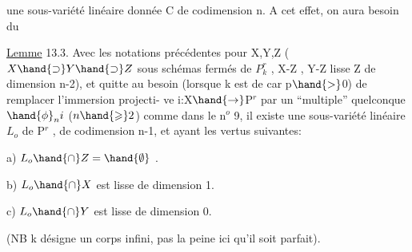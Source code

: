 
une sous-variété linéaire donnée C  de codimension n.  A cet effet,
on aura besoin du

\uline{Lemme} 13.3.  Avec les notations précédentes pour  X,Y,Z  ($X\hand{\supset} Y\hand{\supset} Z$
sous schémas fermés de $P^r_k$ , X-Z\hand{,} ,
Y-Z lisse \hand{,} Z de dimension \hand{$\leqslant$}n-2), et quitte
au besoin (lorsque k est de car p$\hand{>}$0)  de remplacer l'immersion projecti-%
ve  i:X$\hand{\rightarrow}$P$^r$  par  un ``multiple'' quelconque $\hand{\phi}_n i$ ($n \hand{\geqslant} 2$)  comme dans le
n$^o$ 9,  il existe une sous-variété linéaire  $L_o$ de P$^r$ , de codimension
n-1, et ayant les vertus suivantes:

a)  $L_o \hand{\cap} Z = \hand{\emptyset}$ .

b)  $L_o \hand{\cap} X$  est lisse de dimension 1.

c)  $L_o \hand{\cap} Y$   est lisse de dimension  0.

(NB  k désigne un corps infini, pas la peine ici qu'il soit parfait).

